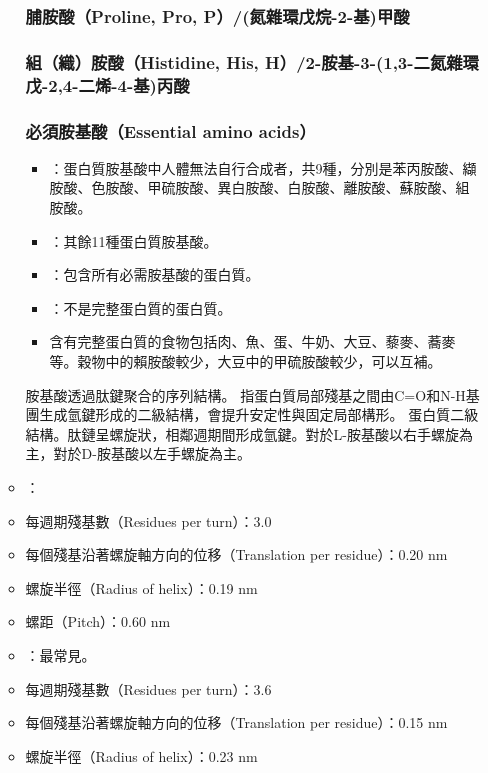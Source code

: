 \documentclass[a4paper,12pt]{report}
\begin{document}
\begin{itemize}
\begin{itemize}
\subsubsection{脯胺酸（Proline, Pro, P）/(氮雜環戊烷-2-基)甲酸}
\subsubsection{組（織）胺酸（Histidine, His, H）/2-胺基-3-(1,3-二氮雜環戊-2,4-二烯-4-基)丙酸}
\subsubsection{必須胺基酸（Essential amino acids）}
\begin{itemize}
\item {}：蛋白質胺基酸中人體無法自行合成者，共9種，分別是苯丙胺酸、纈胺酸、色胺酸、甲硫胺酸、異白胺酸、白胺酸、離胺酸、蘇胺酸、組胺酸。
\item {}：其餘11種蛋白質胺基酸。
\item {}：包含所有必需胺基酸的蛋白質。
\item {}：不是完整蛋白質的蛋白質。
\item 含有完整蛋白質的食物包括肉、魚、蛋、牛奶、大豆、藜麥、蕎麥等。穀物中的賴胺酸較少，大豆中的甲硫胺酸較少，可以互補。
\end{itemize}
胺基酸透過肽鍵聚合的序列結構。
指蛋白質局部殘基之間由C=O和N-H基團生成氫鍵形成的二級結構，會提升安定性與固定局部構形。
蛋白質二級結構。肽鏈呈螺旋狀，相鄰週期間形成氫鍵。對於L-胺基酸以右手螺旋為主，對於D-胺基酸以左手螺旋為主。
\bit
\item {}：
\bit
\item 每週期殘基數（Residues per turn）：3.0
\item 每個殘基沿著螺旋軸方向的位移（Translation per residue）：0.20 nm
\item 螺旋半徑（Radius of helix）：0.19 nm
\item 螺距（Pitch）：0.60 nm
\eit
\item {}：最常見。
\bit
\item 每週期殘基數（Residues per turn）：3.6
\item 每個殘基沿著螺旋軸方向的位移（Translation per residue）：0.15 nm
\item 螺旋半徑（Radius of helix）：0.23 nm

\end{itemize}
\end{itemize}
\end{document}
